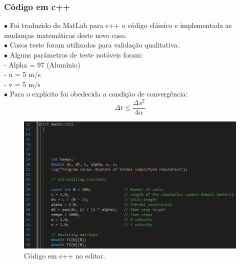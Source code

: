 \documentclass[xcolor=dvipsnames,10pt,aspectratio=169]{beamer}
\begin{document}
	\begin{frame} 
		\frametitle{Código em c++}
		\begin{minipage}[h!]{0.49\textwidth}
			$\bullet$ Foi traduzido do MatLab para c++ o código clássico e implementada as mudanças matemáticas deste novo caso.\\
			$\bullet$ Casos teste foram utilizados para validação qualitativa.\\
			$\bullet$ Alguns parâmetros de teste notáveis foram: \\
			- Alpha = 97 (Alumínio) \\
			- u = 5 m/s \\
			- v = 5 m/s \\
			$\bullet$ Para o explícito foi obedecida a condição de convergência:
			\begin{equation}
				\Delta t \leq \frac{\Delta s ^2}{4 \alpha} 
			\end{equation}
		\end{minipage}
		\begin{minipage}[h!]{0.49\textwidth}
			\begin{figure}[h!]
				\centering
				\includegraphics[trim = {0cm 1cm 5cm 1cm}, clip , angle=0, scale=0.65]{images/printCodigo1}
				\caption{Código em c++ no editor.}
			\end{figure}
		\end{minipage}
	\end{frame}
	
	
	
	
	
\end{document}
